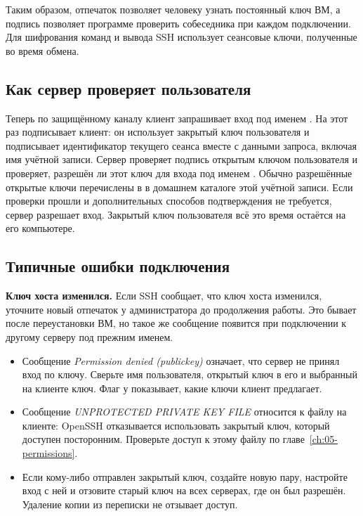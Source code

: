 Таким образом, отпечаток позволяет человеку узнать постоянный ключ ВМ,
а подпись позволяет программе проверить собеседника при каждом
подключении. Для шифрования команд и вывода SSH использует сеансовые
ключи, полученные во время обмена.

\subsection{Как сервер проверяет пользователя}

Теперь по защищённому каналу клиент запрашивает вход под именем
. На этот раз подписывает клиент: он использует закрытый
ключ пользователя и подписывает идентификатор текущего сеанса вместе
с данными запроса, включая имя учётной записи. Сервер проверяет
подпись открытым ключом пользователя и проверяет, разрешён ли этот
ключ для входа под именем . Обычно разрешённые открытые
ключи перечислены в  в домашнем каталоге
этой учётной записи. Если проверки прошли и дополнительных способов
подтверждения не требуется, сервер разрешает вход. Закрытый ключ
пользователя всё это время остаётся на его компьютере.

\subsection{Типичные ошибки подключения}

\noindent\textbf{Ключ хоста изменился.}
Если SSH сообщает, что ключ хоста изменился, уточните новый отпечаток
у администратора до продолжения работы. Это бывает после переустановки
ВМ, но такое же сообщение появится при подключении к другому серверу
под прежним именем.

\begin{itemize}
  \item Сообщение \emph{Permission denied (publickey)} означает, что
    сервер не принял вход по ключу. Сверьте имя пользователя, открытый
    ключ в его  и выбранный на клиенте ключ.
    Флаг  у  показывает, какие ключи клиент предлагает.
  \item Сообщение \emph{UNPROTECTED PRIVATE KEY FILE} относится к файлу
    на клиенте: OpenSSH отказывается использовать закрытый ключ, который
    доступен посторонним. Проверьте доступ к этому файлу по
    главе~\ref{ch:05-permissions}.
  \item Если кому-либо отправлен закрытый ключ, создайте новую пару,
    настройте вход с ней и отзовите старый ключ на всех серверах, где
    он был разрешён. Удаление копии из переписки не отзывает доступ.
\end{itemize}

